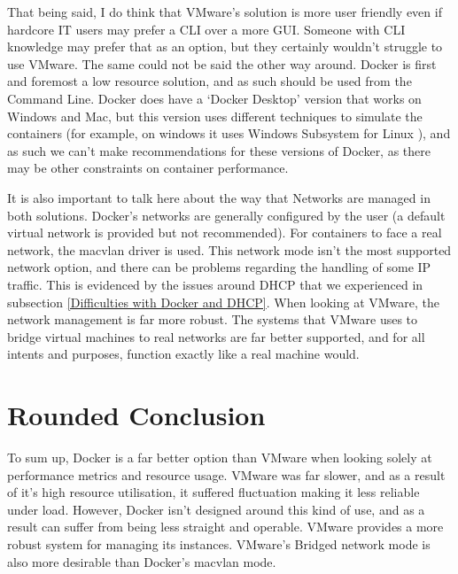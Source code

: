 That being said, I do think that VMware's solution is more user friendly even if hardcore IT users may prefer a CLI over a more GUI. Someone with CLI knowledge may prefer that as an option, but they certainly wouldn't struggle to use VMware. The same could not be said the other way around. Docker is first and foremost a low resource solution, and as such should be used from the Command Line. Docker does have a `Docker Desktop' version that works on Windows and Mac, but this version uses different techniques to simulate the containers (for example, on windows it uses Windows Subsystem for Linux \citep{DockerWindows}), and as such we can't make recommendations for these versions of Docker, as there may be other constraints on container performance.

It is also important to talk here about the way that Networks are managed in both solutions. Docker's networks are generally configured by the user (a default virtual network is provided but not recommended). For containers to face a real network, the macvlan driver is used. This network mode isn't the most supported network option, and there can be problems regarding the handling of some IP traffic. This is evidenced by the issues around DHCP that we experienced in subsection \ref{Difficulties with Docker and DHCP}. When looking at VMware, the network management is far more robust. The systems that VMware uses to bridge virtual machines to real networks are far better supported, and for all intents and purposes, function exactly like a real machine would.



\section{Rounded Conclusion}

To sum up, Docker is a far better option than VMware when looking solely at performance metrics and resource usage. VMware was far slower, and as a result of it's high resource utilisation, it suffered fluctuation making it less reliable under load. However, Docker isn't designed around this kind of use, and as a result can suffer from being less straight and operable. VMware provides a more robust system for managing its instances. VMware's Bridged network mode is also more desirable than Docker's macvlan mode. 

